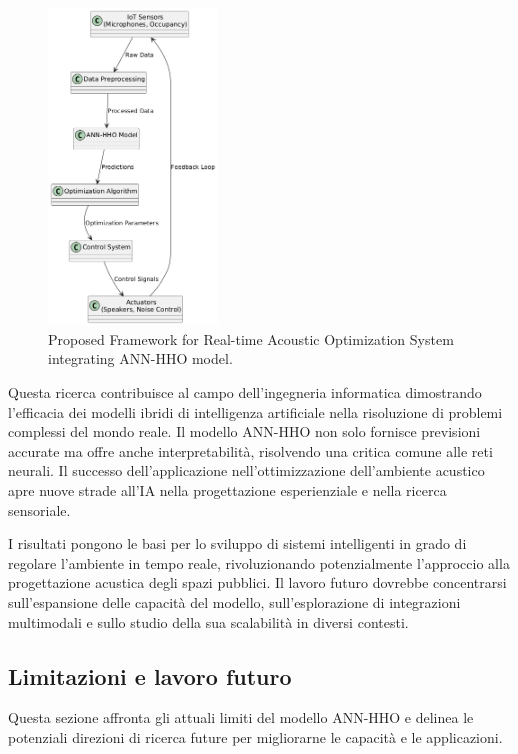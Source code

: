 \begin{figure}[H]
      \centering
      \includegraphics[width=0.4\textwidth]{Chapters/Figures/real_time_system.png}
      \caption{\small Proposed Framework for Real-time Acoustic Optimization System integrating ANN-HHO model.}
      \label{fig:realtimesystem}
\end{figure}

Questa ricerca contribuisce al campo dell'ingegneria informatica dimostrando l'efficacia dei modelli ibridi di intelligenza artificiale nella risoluzione di problemi complessi del mondo reale. Il modello ANN-HHO non solo fornisce previsioni accurate ma offre anche interpretabilità, risolvendo una critica comune alle reti neurali. Il successo dell'applicazione nell'ottimizzazione dell'ambiente acustico apre nuove strade all'IA nella progettazione esperienziale e nella ricerca sensoriale.

I risultati pongono le basi per lo sviluppo di sistemi intelligenti in grado di regolare l'ambiente in tempo reale, rivoluzionando potenzialmente l'approccio alla progettazione acustica degli spazi pubblici. Il lavoro futuro dovrebbe concentrarsi sull'espansione delle capacità del modello, sull'esplorazione di integrazioni multimodali e sullo studio della sua scalabilità in diversi contesti.

\subsection{Limitazioni e lavoro futuro}
\noindent

Questa sezione affronta gli attuali limiti del modello ANN-HHO e delinea le potenziali direzioni di ricerca future per migliorarne le capacità e le applicazioni.

